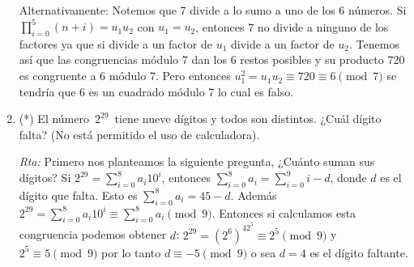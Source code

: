 \documentclass[a4paper,12pt,twoside,spanish,reqno]{amsbook}
\numberwithin{equation}{section}
\newcommand{\rta}{\noindent\textit{Rta: }}
\begin{document}
\begin{enumerate}
    Alternativamente: Notemos que 7 divide a lo sumo a uno de los 6 números. Si $\prod_{i=0}^5(n+i)=u_1u_2$ con $u_1=u_2$, entonces 7 no divide a ninguno de los factores ya que si divide a un factor de $u_1$ divide a un factor de $u_2$. Tenemos así que las congruencias módulo 7 dan los 6 restos posibles y su producto 720 es congruente a 6 módulo 7. Pero entonces $u_1^2=u_1u_2\equiv 720\equiv 6 \pmod{7}$ se tendría que 6 es un cuadrado módulo 7 lo cual es falso.
    
    
    
    \item (*) El número \,$2^{29}$\, tiene nueve dígitos y todos son distintos.
    ¿Cuál dígito falta? (No está permitido el uso de calculadora).
    
    \rta Primero nos planteamos la siguiente pregunta, ¿Cuánto suman sus dígitos? Si $2^{29} =  \sum_{i=0}^8 a_i10^i$, entonces  $\sum_{i=0}^8 a_i= \sum_{i=0}^9i-d$, donde $d$ es el dígito que falta.
    Esto es $\sum_{i=0}^8 a_i= 45-d$. Además $2^{29} = \sum_{i=0}^8 a_i10^i \equiv \sum_{i=0}^8 a_i\pmod{9} $.     Entonces si calculamos esta congruencia podemos obtener $d$: 
    $2^{29}=(2^6)^42^5\equiv 2^5 \pmod{9}$ y $2^5\equiv 5 \pmod{9}$ por lo tanto $d\equiv -5 \pmod{9}$ o sea $d=4$ es el dígito faltante. 
    
\end{enumerate}
\end{document}
